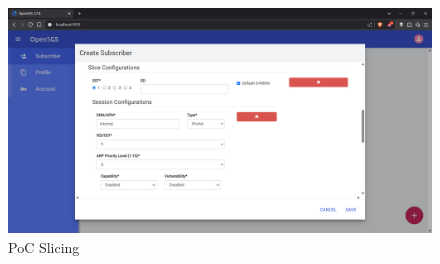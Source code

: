 
\begin{figure}[H]
    \includegraphics[width=\linewidth]{../graphics/POC-Slicing.png}
    \caption{PoC Slicing}
    \label{fig:pocSlicing}
\end{figure}



